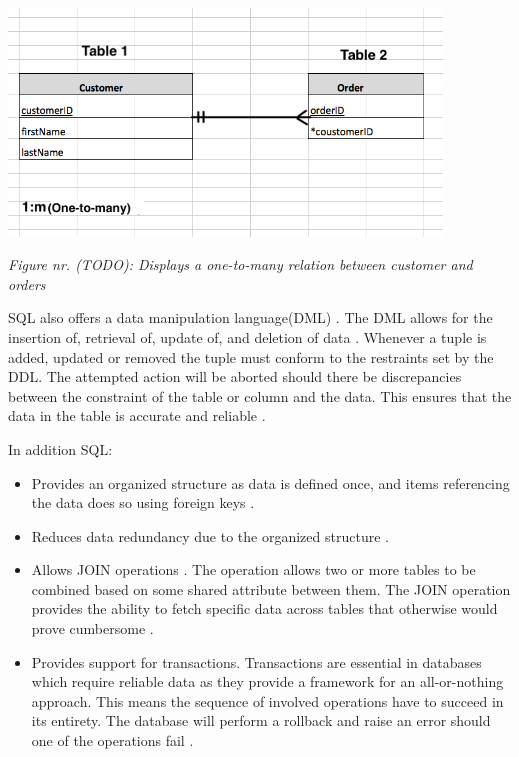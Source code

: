 \includegraphics[width=115mm,scale=1]{figures/relational-db-relation.png}

\textit{Figure nr. (TODO): Displays a one-to-many relation between customer and orders}

SQL also offers a data manipulation language(DML) \cite{sql-components}.
The DML allows for the insertion of, retrieval of, update of, and deletion of data \cite{sql-dml-options}.
Whenever a tuple is added, updated or removed the tuple must conform to the restraints set by the DDL.
The attempted action will be aborted should there be discrepancies between the constraint of the table or column and the data.
This ensures that the data in the table is accurate and reliable \cite{sql-constraints}.

In addition SQL:
\begin{itemize}
    \item Provides an organized structure as data is defined once, and items referencing the data does so using foreign keys \cite{upwork-sql-adv}.
    \item Reduces data redundancy due to the organized structure \cite{upwork-sql-adv}.
    \item Allows JOIN operations \cite{upwork-sql-adv}.
    The operation allows two or more tables to be combined based on some shared attribute between them.
    The JOIN operation provides the ability to fetch specific data across tables that otherwise would prove cumbersome \cite{sql-joins}.
    \item Provides support for transactions.
    Transactions are essential in databases which require reliable data as they provide a framework for an all-or-nothing approach.
    This means the sequence of involved operations have to succeed in its entirety.
    The database will perform a rollback and raise an error should one of the operations fail \cite{sql-transactions}.
\end{itemize}

